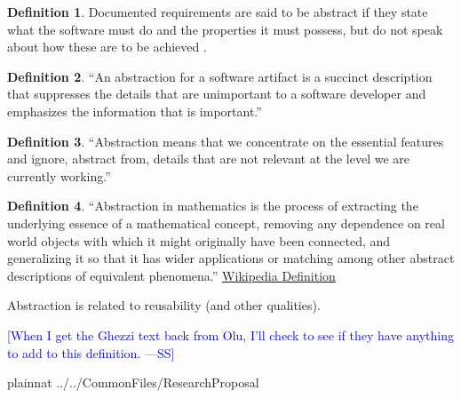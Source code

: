 \documentclass[letterpaper,cleveref]{lipics-v2019}
\newcommand{\authornote}[3]{\textcolor{#1}{[#3 ---#2]}}
\newcommand{\authornote}[3]{}
\newcommand{\wss}[1]{\authornote{blue}{SS}{#1}} %
\theoremstyle{definition}
\newtheorem{defn}{Definition}
\begin{document}
\begin{defn}
Documented requirements are said to be abstract if they state what the software
must do and the properties it must possess, but do not speak about how these are
to be achieved \citep{GhezziEtAl2003}.  
\end{defn}

\begin{defn}
``An abstraction for a software artifact is a succinct description that suppresses
the details that are unimportant to a software developer and emphasizes the
information that is important.'' \cite{Krueger1992}
\end{defn}

\begin{defn}
``Abstraction means that we concentrate on the essential features and ignore,
abstract from, details that are not relevant at the level we are currently
working.''  \cite[p.\ 296]{VanVliet2000}
\end{defn}

\begin{defn}
``Abstraction in mathematics is the process of extracting the underlying essence
of a mathematical concept, removing any dependence on real world objects with
which it might originally have been connected, and generalizing it so that it
has wider applications or matching among other abstract descriptions of
equivalent phenomena.''
\href{https://en.wikipedia.org/wiki/Abstraction_(mathematics)} {Wikipedia
  Definition}
\end{defn}

Abstraction is related to reusability (and other qualities).

\wss{When I get the Ghezzi text back from Olu, I'll check to see if they have
  anything to add to this definition.}

\newpage

 {plainnat}
 {../../CommonFiles/ResearchProposal}
\end{document}
